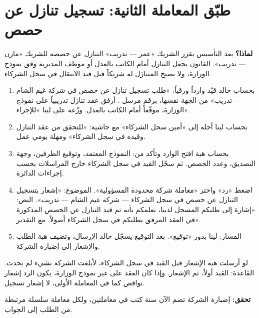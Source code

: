 \section{طبّق المعاملة الثانية: تسجيل تنازل عن حصص}
\label{sec:co-transfer}
\textbf{لماذا؟} بعد التأسيس يقرر الشريك «عمر — تدريب» التنازل عن حصصه للشريك «مازن — تدريب». القانون يجعل التنازل أمام الكاتب بالعدل أو موظف المديرية وفق نموذج الوزارة، ولا يصبح المتنازَل له شريكاً قبل قيد الانتقال في سجل الشركاء.
\begin{enumerate}
\item بحساب خالد قيّد وارداً ورقياً: «طلب تسجيل تنازل عن حصص في شركة غيم الشام — تدريب» من الجهة نفسها، برقم مرسل . أرفق عقد تنازل تدريبياً على نموذج الوزارة، موقّعاً أمام الكاتب بالعدل. وزّعه على لينا «للإجراء».
\item بحساب لينا أحله إلى «أمين سجل الشركاء» مع حاشية: «للتحقق من عقد التنازل وقيده في سجل الشركاء» ومهلة يومي عمل.
\item بحساب هبة افتح الوارد وتأكد من: النموذج المعتمد، وتوقيع الطرفين، وجهة التصديق، وعدد الحصص. ثم سجّل القيد في سجل الشركاء خارج المراسلات بحسب إجراءات الدائرة.
\item اضغط «رد» واختر «معاملة شركة محدودة المسؤولية». الموضوع: «إشعار بتسجيل التنازل عن حصص في سجل الشركاء — شركة غيم الشام — تدريب». النص: «إشارة إلى طلبكم المسجل لدينا، نعلمكم بأنه تم قيد التنازل عن الحصص المذكورة في العقد المرفق بطلبكم في سجل الشركاء أصولاً. مع التقدير».
\item المسار: لينا بدور «توقيع». بعد التوقيع يسجّل خالد الإرسال، وتضيف هبة الطلب والإشعار إلى إضبارة الشركة.
\end{enumerate}
\begin{rcnote}
لو أرسلت هبة الإشعار قبل القيد في سجل الشركاء، لأبلغت الشركة بشيء لم يحدث. القاعدة: القيد أولاً، ثم الإشعار. وإذا كان العقد على غير نموذج الوزارة، يكون الرد إشعار نواقص كما في المعاملة الأولى، لا إشعار تسجيل.
\end{rcnote}
\textbf{تحقق:} إضبارة الشركة تضم الآن ستة كتب في معاملتين، ولكل معاملة سلسلة مرتبطة من الطلب إلى الجواب.

